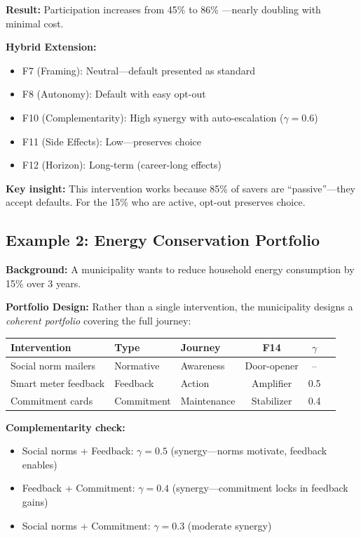 \textbf{Result:} Participation increases from 45\% to 86\% \citep{madrian2001}---nearly doubling with minimal cost.

\textbf{Hybrid Extension:}
\begin{itemize}
\item F7 (Framing): Neutral---default presented as standard
\item F8 (Autonomy): Default with easy opt-out
\item F10 (Complementarity): High synergy with auto-escalation ($\gamma = 0.6$)
\item F11 (Side Effects): Low---preserves choice
\item F12 (Horizon): Long-term (career-long effects)
\end{itemize}

\textbf{Key insight:} This intervention works because 85\% of savers are ``passive''---they accept defaults. For the 15\% who are active, opt-out preserves choice.

\subsection{Example 2: Energy Conservation Portfolio}

\textbf{Background:} A municipality wants to reduce household energy consumption by 15\% over 3 years.

\textbf{Portfolio Design:} Rather than a single intervention, the municipality designs a \textit{coherent portfolio} covering the full journey:

\begin{table}[htbp]
\centering
\small
\renewcommand{\arraystretch}{1.3}
\begin{tabular}{@{}lllccl@{}}
\toprule
\textbf{Intervention} & \textbf{Type} & \textbf{Journey} & \textbf{F14} & \textbf{$\gamma$} \\
\midrule
Social norm mailers & Normative & Awareness & Door-opener & -- \\
Smart meter feedback & Feedback & Action & Amplifier & 0.5 \\
Commitment cards & Commitment & Maintenance & Stabilizer & 0.4 \\
\bottomrule
\end{tabular}
\end{table}

\textbf{Complementarity check:}
\begin{itemize}
\item Social norms + Feedback: $\gamma = 0.5$ (synergy---norms motivate, feedback enables)
\item Feedback + Commitment: $\gamma = 0.4$ (synergy---commitment locks in feedback gains)
\item Social norms + Commitment: $\gamma = 0.3$ (moderate synergy)
\end{itemize}

